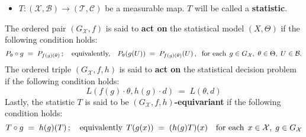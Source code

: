 \begin{definition}
\begin{itemize}
	\item $T : (\mathcal{X},\mathcal{B}) \longrightarrow (\mathcal{T},\mathcal{C})$ be a measurable
	      map.  $T$ will be called a \textbf{statistic}.
\end{itemize}
The ordered pair $(G_{\mathcal{X}}, f)$ is said to \textbf{act on} the statistical model
$\left(X,\Theta\right)$ if the following condition holds:
\begin{equation*}
P_{\theta}\circ g \; = \; P_{f(g)(\theta)}
\,;\quad\textnormal{equivalently,}\quad
P_{\theta}\!\left(g(U)\right) \; = \; P_{f(g)(\theta)}\!\left(U\right),
\;\;\textnormal{for each}\;\, g \in G_{\mathcal{X}},\; \theta \in \Theta,\; U \in \mathcal{B}.
\end{equation*}
The ordered triple $(G_{\mathcal{X}},f,h)$ is said to \textbf{act on} the statistical decision
problem if the following condition holds: 
\begin{equation*}
L\!\left(f(g)\cdot\theta,h(g)\cdot d\right) \; = \; L(\theta,d)
\end{equation*}
Lastly,%
the statistic $T$ is said to be \textbf{$(G_{\mathcal{X}},f,h)$-equivariant} if the following
condition holds:
\begin{equation*}
T \circ g \; = \; h(g)(T) \,;
\quad\textnormal{equivalently}\,\;
T(g(x)) \; = \; (h(g)T)(x)
\quad\textnormal{for each}\;\, x \in \mathcal{X}, \; g \in G_{\mathcal{X}}
\end{equation*}
\end{definition}
